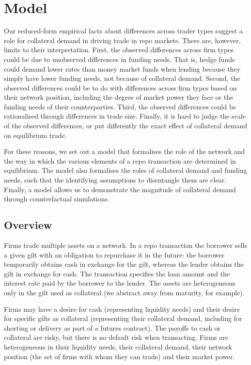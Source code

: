 
\section{Model} \label{sec:model}

Our reduced-form empirical facts about differences across trader types suggest a role for collateral demand in driving trade in repo markets. There are, however, limits to their interpretation. First, the observed differences across firm types could be due to unobserved differences in funding needs. That is, hedge funds could demand lower rates than money market funds when lending because they simply have lower funding needs, not because of collateral demand. Second, the observed differences could be to do with differences across firm types based on their network position, including the degree of market power they face or the funding needs of their counterparties. Third, the observed differences could be rationalised through differences in trade size. Finally, it is hard to judge the scale of the observed differences, or put differently the exact effect of collateral demand on equilibrium trade.

For these reasons, we set out a model that formalises the role of the network and the way in which the various elements of a repo transaction are determined in equilibrium. The model also formalises the roles of collateral demand and funding needs, such that the identifying assumptions to disentangle them are clear. Finally, a model allows us to demonstrate the magnitude of collateral demand through counterfactual simulations.

\subsection{Overview}
Firms trade multiple assets on a network. In a repo transaction the borrower sells a given gilt with an obligation to repurchase it in the future: the borrower temporarily obtains cash in exchange for the gilt, whereas the lender obtains the gilt in exchange for cash. The transaction specifies the loan amount and the interest rate paid by the borrower to the lender. The assets are heterogeneous only in the gilt used as collateral (we abstract away from maturity, for example).

Firms may have a desire for cash (representing liquidity needs) and their desire for specific gilts as collateral (representing their collateral demand, including for shorting or delivery as part of a futures contract). The payoffs to cash or collateral are risky, but there is no default risk when transacting. Firms are heterogeneous in their liquidity needs, their collateral demand, their network position (the set of firms with whom they can trade) and their market power. 

